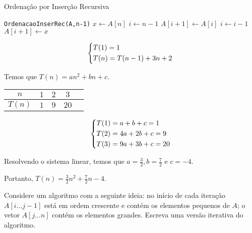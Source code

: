 \documentclass[a4paper]{memoir}
\begin{document}
\begin{sol}
 
\begin{algorithm}
\caption*{Ordenação por Inserção Recursiva}
\begin{algorithmic}[1]
   
    \State \texttt{OrdenacaoInserRec(A,n-1)} 
    \State $x \gets A[n]$  
    \State $i \gets n - 1$  
     
      \State $A[i + 1] \gets A[i]$ 
      \State $i \gets i - 1$ 
    \EndWhile
    \State $A[i + 1] \gets x$ 
  \EndIf
\EndFunction
\end{algorithmic}
\end{algorithm}

\[
\left\{ \begin{gathered}
  T(1) = 1 \hfill \\
  T(n) = T(n - 1) + 3n + 2 \hfill \\
\end{gathered} \right.
\]

Temos que $T(n) = an^2 + bn + c$.

\begin{center}
\begin{tabular}{|c*{4}{|c}}
\hline
$n$ & $1$ & $2$ & $3$\\ \hline
$T(n)$ & $1$ & $9$ & $20$\\ \hline
\end{tabular}
\end{center}

\[
\left\{ \begin{gathered}
  T(1) = a + b + c = 1 \hfill \\
  T(2) = 4a + 2b + c = 9 \hfill \\
  T(3) = 9a + 3b + c = 20 \hfill \\ 
\end{gathered}  \right.
\]

Resolvendo o sistema linear, temos que $a = \frac{3}{2}, b = \frac{7}{2}$ e $c = -4$.

Portanto, $T(n) = \frac{3}{2}n^2 + \frac{7}{2}n - 4$.
\end{sol}

\newpage 

\begin{ex}
Considere um algoritmo com a seguinte ideia: no início de cada iteração $A[i \ldots j - 1]$ está em ordem crescente e contém os elementos pequenos de $A$; o vetor $A[j \ldots n]$ contém os elementos grandes. Escreva uma versão iterativa do algoritmo.
\end{ex}
\end{document}
